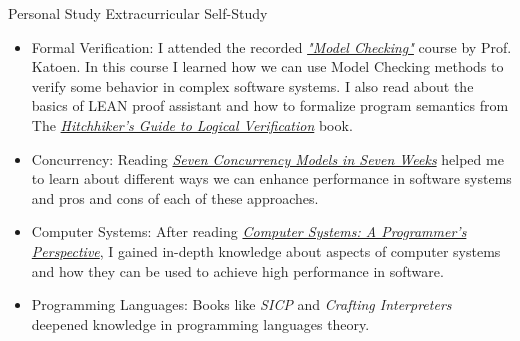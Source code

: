 \begin{cventries}
  \cventry
  {Personal Study} %
  {Extracurricular Self-Study} %
  {} %
  {} %
  {
    \begin{cvitems} %
\begin{itemize}
        \item  Formal Verification: \newline
          I attended the recorded \href{https://www.youtube.com/playlist?list=PLwabKnOFhE38C0o6z_bhlF_uOUlblDTjh}{\textit{"Model Checking"}} course by Prof. Katoen. In this course I learned how we can use Model Checking methods to verify some behavior in complex software systems.
          \newline
          I also read about the basics of LEAN proof assistant and how to formalize program semantics from The \href{https://github.com/blanchette/logical_verification_2023}{\textit{Hitchhiker’s Guide to Logical Verification}} book.
        \item  Concurrency: \newline
          Reading
          \href{https://pragprog.com/titles/pb7con/seven-concurrency-models-in-seven-weeks/}{\textit{Seven
              Concurrency Models in Seven Weeks}} helped me to learn about
          different ways we can enhance performance in software systems and
          pros and cons of each of these approaches.
        \item Computer Systems:
          \newline
          After reading
          \href{http://csapp.cs.cmu.edu/2e/samples.html}{\textit{
              Computer Systems: A Programmer's Perspective}}, I gained
          in-depth knowledge
          about aspects of computer systems and how they can be used to achieve high performance in software.
        \item Programming Languages:
          \newline
          Books like \textit{SICP} and \textit{Crafting Interpreters} deepened knowledge in programming languages theory.
        \end{itemize}
    \end{cvitems}
  }

\end{cventries}
